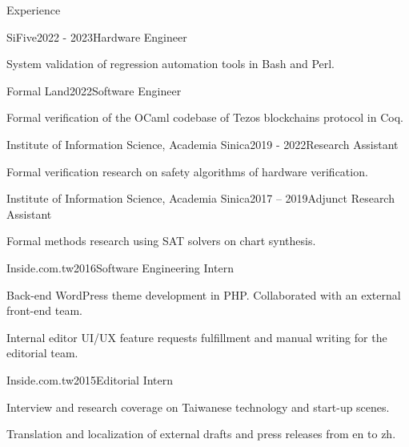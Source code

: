 \documentclass{resume} %
\begin{document}
\begin{rSection}{Experience}

\begin{rSubsection}{SiFive}{2022 - 2023}{Hardware Engineer}{}
\item System validation of regression automation tools in Bash and Perl.
\end{rSubsection}

\begin{rSubsection}{Formal Land}{2022}{Software Engineer}{}
\item Formal verification of the OCaml codebase of Tezos blockchains protocol in Coq.
\end{rSubsection}

\begin{rSubsection}{Institute of Information Science, Academia Sinica}{2019 - 2022}{Research Assistant}{}
\item Formal verification research on safety algorithms of hardware verification.
\end{rSubsection}


\begin{rSubsection}{Institute of Information Science, Academia Sinica}{2017 – 2019}{Adjunct Research Assistant}{}
\item Formal methods research using SAT solvers on chart synthesis.
\end{rSubsection}


\begin{rSubsection}{Inside.com.tw}{2016}{Software Engineering Intern}{}
\item Back-end WordPress theme development in PHP. Collaborated with an external front-end team.
\item Internal editor UI/UX feature requests fulfillment and manual writing for the editorial team.
\end{rSubsection}


\begin{rSubsection}{Inside.com.tw}{2015}{Editorial Intern}{}
\item Interview and research coverage on Taiwanese technology and start-up scenes.
\item Translation and localization of external drafts and press releases from en to zh.
\end{rSubsection}

\end{rSection}
\end{document}

